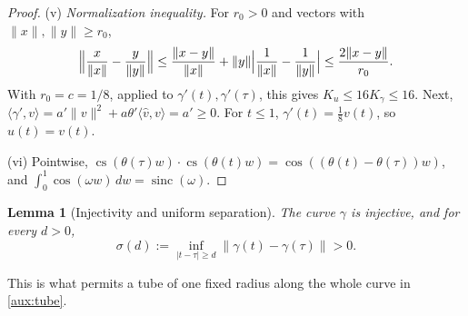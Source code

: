 \documentclass[11pt]{article}
\newcommand{\norm}[1]{\lVert #1\rVert}
\newcommand{\ip}[2]{\langle #1,#2\rangle}
\DeclareMathOperator{\sinc}{sinc}
\DeclareMathOperator{\cvec}{cs}
\newtheorem{lemma}[theorem]{Lemma}
\theoremstyle{definition}
\numberwithin{equation}{section}
\begin{document}
\begin{proof}
(v) \emph{Normalization inequality.} For \(r_0>0\) and vectors with
\(\norm x,\norm y\ge r_0\),
\[
 \Bigl\|\frac{x}{\norm x}-\frac{y}{\norm y}\Bigr\|
 \le\frac{\norm{x-y}}{\norm x}+\norm y\Bigl|\frac1{\norm x}-\frac1{\norm y}\Bigr|
 \le\frac{2\norm{x-y}}{r_0}.
\]
With \(r_0=c=1/8\), applied to \(\gamma'(t),\gamma'(\tau)\), this gives
\(K_u\le16K_\gamma\le16\). Next,
\(\ip{\gamma'}{v}=a'\norm v^2+a\theta'\ip{\hat v}{v}=a'\ge0\). For \(t\le1\),
\(\gamma'(t)=\frac18v(t)\), so \(u(t)=v(t)\).

(vi) Pointwise,
\(\cvec(\theta(\tau)w)\cdot\cvec(\theta(t)w)=\cos((\theta(t)-\theta(\tau))w)\),
and \(\int_0^1\cos(\omega w)\,dw=\sinc(\omega)\).
\end{proof}

\begin{lemma}[Injectivity and uniform separation]\label{aux:sep}
The curve \(\gamma\) is injective, and for every \(d>0\),
\begin{equation}\label{aux:separation}
 \sigma(d):=\inf_{|t-\tau|\ge d}\norm{\gamma(t)-\gamma(\tau)}>0 .
\end{equation}
\end{lemma}
This is what permits a tube of one fixed radius along the whole curve in
\cref{aux:tube}.
\end{document}
